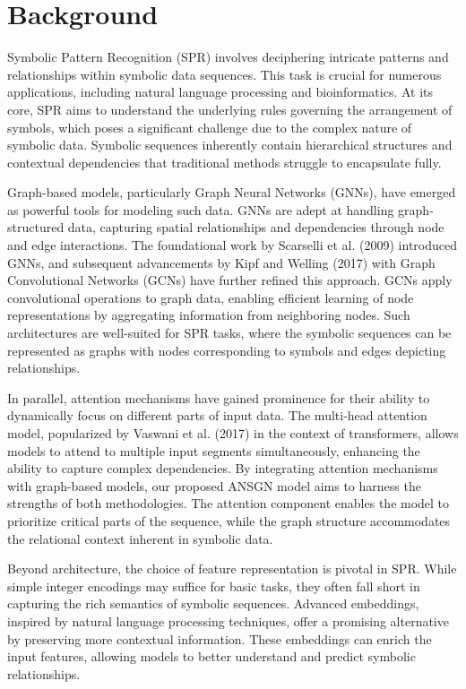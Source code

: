 \documentclass{article}
\begin{document}
\section{Background}
Symbolic Pattern Recognition (SPR) involves deciphering intricate patterns and relationships within symbolic data sequences. This task is crucial for numerous applications, including natural language processing and bioinformatics. At its core, SPR aims to understand the underlying rules governing the arrangement of symbols, which poses a significant challenge due to the complex nature of symbolic data. Symbolic sequences inherently contain hierarchical structures and contextual dependencies that traditional methods struggle to encapsulate fully.

Graph-based models, particularly Graph Neural Networks (GNNs), have emerged as powerful tools for modeling such data. GNNs are adept at handling graph-structured data, capturing spatial relationships and dependencies through node and edge interactions. The foundational work by Scarselli et al. (2009) introduced GNNs, and subsequent advancements by Kipf and Welling (2017) with Graph Convolutional Networks (GCNs) have further refined this approach. GCNs apply convolutional operations to graph data, enabling efficient learning of node representations by aggregating information from neighboring nodes. Such architectures are well-suited for SPR tasks, where the symbolic sequences can be represented as graphs with nodes corresponding to symbols and edges depicting relationships.

In parallel, attention mechanisms have gained prominence for their ability to dynamically focus on different parts of input data. The multi-head attention model, popularized by Vaswani et al. (2017) in the context of transformers, allows models to attend to multiple input segments simultaneously, enhancing the ability to capture complex dependencies. By integrating attention mechanisms with graph-based models, our proposed ANSGN model aims to harness the strengths of both methodologies. The attention component enables the model to prioritize critical parts of the sequence, while the graph structure accommodates the relational context inherent in symbolic data.

Beyond architecture, the choice of feature representation is pivotal in SPR. While simple integer encodings may suffice for basic tasks, they often fall short in capturing the rich semantics of symbolic sequences. Advanced embeddings, inspired by natural language processing techniques, offer a promising alternative by preserving more contextual information. These embeddings can enrich the input features, allowing models to better understand and predict symbolic relationships.
\end{document}
